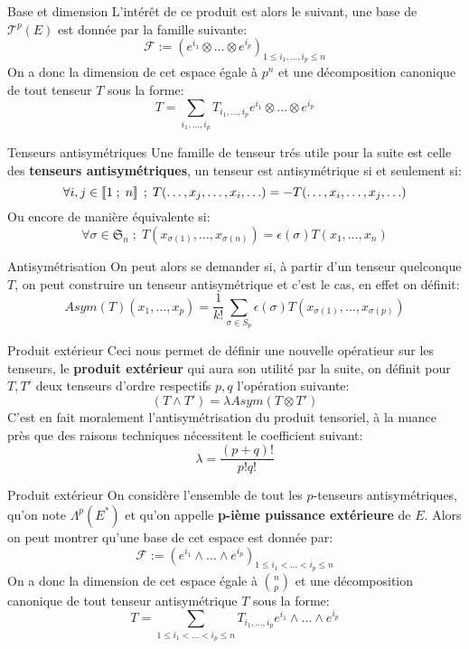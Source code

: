 \documentclass{beamer}
\begin{document}
        \begin{frame}{Base et dimension}
            L'intérêt de ce produit est alors le suivant, une base de $\mathscr{T}^p(E)$ est donnée par la famille suivante:
            \[
                \mathscr{F} := (e^{i_1} \otimes \ldots \otimes e^{i_p})_{1 \leq i_1, \ldots, i_p \leq n}
            \]
            On a donc la dimension de cet espace égale à $p^n$ et une décomposition canonique de tout tenseur $T$ sous la forme:
            \[
                T = \sum_{i_1, \ldots, i_p} T_{i_1, \ldots, i_p} e^{i_1} \otimes \ldots \otimes e^{i_p}
            \]
        \end{frame}
        \begin{frame}{Tenseurs antisymétriques}
            Une famille de tenseur trés utile pour la suite est celle des \textbf{tenseurs antisymétriques}, un tenseur est antisymétrique si et seulement si:
            \[
                \forall i, j \in \left\llbracket{1}\;;\;{n}\right\rrbracket  \; ; \; T(\ldots, x_j, \ldots, x_i, \ldots) = -T(\ldots, x_i, \ldots, x_j, \ldots)
            \]
            Ou encore de manière équivalente si:
            \[
                \forall \sigma \in \mathfrak{S}_n  \; ; \; T(x_{\sigma(1)}, \ldots, x_{\sigma(n)}) = \epsilon(\sigma)T(x_1, \ldots, x_n)
            \]

        \end{frame}
        \begin{frame}{Antisymétrisation}
            On peut alors se demander si, à partir d'un tenseur quelconque $T$, on peut construire un tenseur antisymétrique et c'est le cas, en effet on définit:
            \[
                Asym(T)(x_1, \ldots, x_p) = \frac{1}{k!}\sum_{\sigma \in S_p}\epsilon(\sigma)T(x_{\sigma(1)}, \ldots, x_{\sigma(p)})
             \]
        \end{frame}
        \begin{frame}{Produit extérieur}
            Ceci nous permet de définir une nouvelle opératieur sur les tenseurs, le \textbf{produit extérieur} qui aura son utilité par la suite, on définit pour $T, T'$ deux tenseurs d'ordre respectifs $p ,q$ l'opération suivante:
            \[
                (T \wedge T') = \lambda Asym(T \otimes T')             
            \]
            C'est en fait moralement l'antisymétrisation du produit tensoriel, à la nuance près que des raisons techniques nécessitent le coefficient suivant:
            \[
                \lambda = \frac{(p+q)!}{p!q!}
            \]
        \end{frame}
        \begin{frame}{Produit extérieur}
            On considère l'ensemble de tout les $p$-tenseurs antisymétriques, qu'on note $\Lambda^p(E^*)$ et qu'on appelle \textbf{p-ième puissance extérieure} de $E$. Alors on peut montrer qu'une base de cet espace est donnée par:
            \[
                \mathscr{F} := (e^{i_1} \wedge \ldots \wedge e^{i_p})_{1 \leq i_1 < \ldots < i_p \leq n}
            \]
            On a donc la dimension de cet espace égale à $\binom{n}{p}$ et une décomposition canonique de tout tenseur antisymétrique $T$ sous la forme:
            \[
                T = \sum_{1 \leq i_1 < \ldots < i_p \leq n} T_{i_1, \ldots, i_p} e^{i_1} \wedge \ldots \wedge e^{i_p}
            \]
        \end{frame}        
\end{document}

